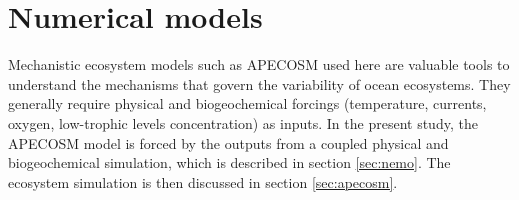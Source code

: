 
\section{Numerical models}
\label{sec:model-des}

Mechanistic ecosystem models such as APECOSM used here are valuable tools to understand the mechanisms that govern the variability of ocean ecosystems. They generally require physical and biogeochemical forcings (temperature, currents, oxygen, low-trophic levels concentration) as inputs. In the present study, the APECOSM model is forced by the outputs from a coupled physical and biogeochemical simulation, which is described in section \ref{sec:nemo}. The ecosystem simulation is then discussed in section \ref{sec:apecosm}.





